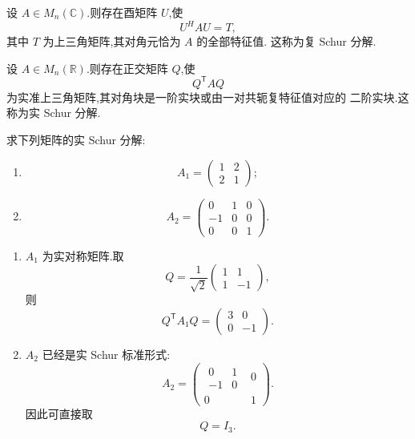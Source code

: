 \begin{theorem}[\markstar]
设 $A\in M_n(\mathbb{C})$.则存在酉矩阵 $U$,使
\[
U^HAU=T,
\]
其中 $T$ 为上三角矩阵,其对角元恰为 $A$ 的全部特征值.
这称为复 Schur 分解.
\end{theorem}

\begin{theorem}[\markstar]
设 $A\in M_n(\mathbb{R})$.则存在正交矩阵 $Q$,使
\[
Q^{\mathsf T}AQ
\]
为实准上三角矩阵,其对角块是一阶实块或由一对共轭复特征值对应的
二阶实块.这称为实 Schur 分解.
\end{theorem}


\begin{example}
求下列矩阵的实 Schur 分解:
\begin{enumerate}
    \item
    \[
    A_1=
    \begin{pmatrix}
    1&2\\
    2&1
    \end{pmatrix};
    \]
    \item
    \[
    A_2=
    \begin{pmatrix}
    0&1&0\\
    -1&0&0\\
    0&0&1
    \end{pmatrix}.
    \]
\end{enumerate}
\end{example}
\exampleblank

\begin{solution}
\leavevmode
\begin{enumerate}
    \item $A_1$ 为实对称矩阵.取
    \[
    Q=
    \dfrac1{\sqrt2}
    \begin{pmatrix}
    1&1\\
    1&-1
    \end{pmatrix},
    \]
    则
    \[
    \boxed{
    Q^{\mathsf T}A_1Q
    =
    \begin{pmatrix}
    3&0\\
    0&-1
    \end{pmatrix}.
    }
    \]

    \item $A_2$ 已经是实 Schur 标准形式:
    \[
    A_2=
    \begin{pmatrix}
    \boxed{\begin{matrix}0&1\\-1&0\end{matrix}}&0\\
    0&1
    \end{pmatrix}.
    \]
    因此可直接取
    \[
    \boxed{Q=I_3}.
    \]
\end{enumerate}
\end{solution}


